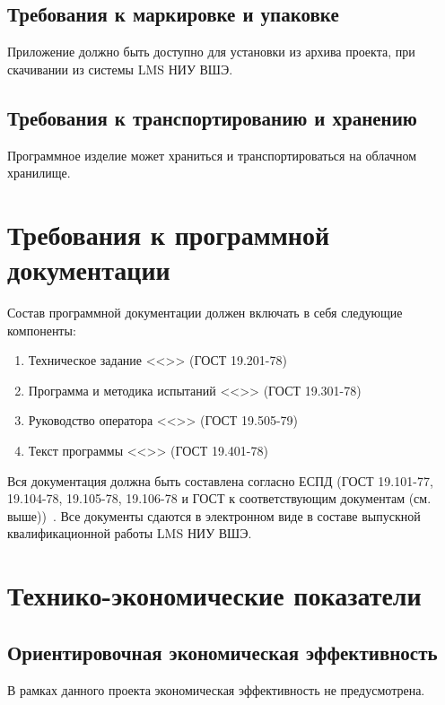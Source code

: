 \documentclass[a4paper,12pt,reqno]{article}
\begin{document}
    \subsection{Требования к маркировке и упаковке}
    Приложение должно быть доступно для установки из архива проекта, при скачивании из системы LMS НИУ ВШЭ.

    \subsection{Требования к транспортированию и хранению}
    Программное изделие может храниться и транспортироваться на облачном хранилище.
    \newpage


    \section{Требования к программной документации}
    Состав программной документации должен включать в себя следующие компоненты:
    \begin{enumerate}
        \item Техническое задание <<\unskip>> (ГОСТ 19.201-78) \label{tz}
        \item Программа и методика испытаний <<\unskip>> (ГОСТ 19.301-78) \label{pmi}
        \item Руководство оператора <<\unskip>> (ГОСТ 19.505-79) \label{ro}
        \item Текст программы <<\unskip>> (ГОСТ 19.401-78) \label{tp}
    \end{enumerate}

    \indent
    Вся документация должна быть составлена согласно ЕСПД (ГОСТ 19.101-77, 19.104-78, 19.105-78, 19.106-78 и ГОСТ к соответствующим документам (см. выше))~\cite{TZ:gost0, TZ:gost1, TZ:gost2, TZ:gost3, TZ:gost4, TZ:gost5, TZ:gost6, TZ:gost7, TZ:gost8, TZ:gost9}. Все документы сдаются в электронном виде в составе выпускной квалификационной работы LMS НИУ ВШЭ.
    \newpage


    \section{Технико-экономические показатели}

    \subsection{Ориентировочная экономическая эффективность}
    В рамках данного проекта экономическая эффективность не предусмотрена.
\end{document}
